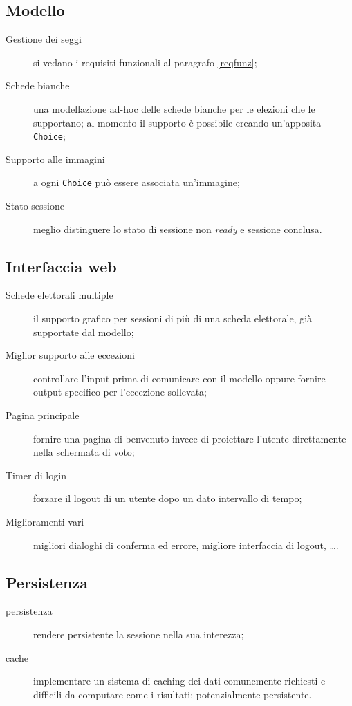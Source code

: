 \subsection{Modello}
\begin{description}
	\item[Gestione dei seggi] si vedano i requisiti funzionali al paragrafo \ref{reqfunz};
	\item[Schede bianche] una modellazione ad-hoc delle schede bianche per le elezioni che le supportano; al momento il supporto è possibile creando un'apposita \verb!Choice!;
	\item[Supporto alle immagini] a ogni \verb!Choice! può essere associata un'immagine;
	\item[Stato sessione] meglio distinguere lo stato di sessione non \emph{ready} e sessione conclusa.
\end{description}


\subsection{Interfaccia web}
\begin{description}
	\item[Schede elettorali multiple] il supporto grafico per sessioni di più di una scheda elettorale, già supportate dal modello;
	\item[Miglior supporto alle eccezioni] controllare l'input prima di comunicare con il modello oppure fornire output specifico per l'eccezione sollevata;
	\item[Pagina principale] fornire una pagina di benvenuto invece di proiettare l'utente direttamente nella schermata di voto;
	\item[Timer di login] forzare il logout di un utente dopo un dato intervallo di tempo;
	\item[Miglioramenti vari] migliori dialoghi di conferma ed errore, migliore interfaccia di logout, \dots.
\end{description}


\subsection{Persistenza}
\begin{description}
	\item[persistenza] rendere persistente la sessione nella sua interezza;
	\item[cache] implementare un sistema di caching dei dati comunemente richiesti e difficili da computare come i risultati; potenzialmente persistente.
\end{description}




